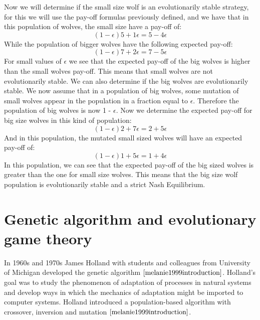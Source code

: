 Now we will determine if the small size wolf is an evolutionarily stable strategy, for this we will use the pay-off formulas previously defined, and we have that in this population of wolves, the small size have a pay-off of:
\begin{equation}
(1-{\epsilon})5 + 1{\epsilon} = 5 - 4{\epsilon}
\end{equation}
While the population of bigger wolves have the following expected pay-off:
\begin{equation}
(1-{\epsilon})7 + 2{\epsilon} = 7 - 5{\epsilon}
\end{equation}
For small values of $\epsilon$ we see that the expected pay-off of the big wolves is higher than the small wolves pay-off.  This means that small wolves are not evolutionarily stable.
We can also determine if the big wolves are evolutionarily stable. We now assume that in a population of big wolves, some mutation of small wolves appear in the population in a fraction equal to $\epsilon$. Therefore the population of big wolves is now 1 - $\epsilon$. Now we determine the expected pay-off for big size wolves in this kind of population:
 \begin{equation}
(1-{\epsilon})2 + 7{\epsilon} = 2 + 5{\epsilon}
\end{equation}
And in this population, the mutated small sized wolves will have an expected pay-off of:
\begin{equation}
(1-{\epsilon})1 + 5{\epsilon} = 1 + 4{\epsilon}
\end{equation}
In this population, we can see that the expected pay-off of the big sized wolves is greater than the one for small size wolves. This means that the big size wolf population is evolutionarily stable and a strict Nash Equilibrium.

\section{Genetic algorithm and evolutionary game theory} \label{sec:genalg}
 In 1960s and 1970s James Holland with students and colleagues from University of Michigan developed the genetic algorithm $\cite{melanie1999introduction}$. Holland's goal was to study the phenomenon of adaptation of processes in natural systems and develop ways in which the mechanics of adaptation might be imported to computer systems. Holland introduced a population-based algorithm with crossover, inversion and mutation $\cite{melanie1999introduction}$.

